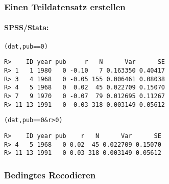 \begin{frame}[fragile]\frametitle{Einen Teildatensatz erstellen}\framesubtitle{SPSS/Stata: }
\begin{footnotesize}
\begin{knitrout}
\color{fgcolor}\begin{kframe}
\begin{alltt}
(dat, pub==0)
\end{alltt}
\begin{verbatim}
R>    ID year pub     r   N      Var      SE
R> 1   1 1980   0 -0.10   7 0.163350 0.40417
R> 3   4 1968   0 -0.05 155 0.006461 0.08038
R> 4   5 1968   0  0.02  45 0.022709 0.15070
R> 7   9 1970   0 -0.07  79 0.012695 0.11267
R> 11 13 1991   0  0.03 318 0.003149 0.05612
\end{verbatim}
\begin{alltt}
(dat, pub==0 & r > 0)
\end{alltt}
\begin{verbatim}
R>    ID year pub    r   N      Var      SE
R> 4   5 1968   0 0.02  45 0.022709 0.15070
R> 11 13 1991   0 0.03 318 0.003149 0.05612
\end{verbatim}
\end{kframe}
\end{knitrout}

\end{footnotesize}
\end{frame}



\begin{frame}[fragile]\frametitle{Bedingtes Recodieren}
\begin{footnotesize}
\begin{knitrout}
\color{fgcolor}
\end{knitrout}

\end{footnotesize}
\end{frame}


